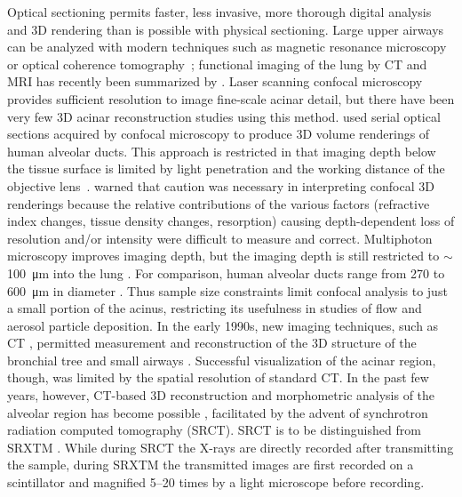 Optical sectioning permits faster, less invasive, more thorough digital analysis and 3D rendering than is possible with physical sectioning. Large upper airways can be analyzed with modern techniques such as magnetic resonance microscopy~\cite{Hoffman1990,Sundaramoorthy1995} or optical coherence tomography~\cite{Hanna2005}; functional imaging of the lung by CT and MRI has recently been summarized by \citet{VanBeek2008}. Laser scanning confocal microscopy provides sufficient resolution to image fine-scale acinar detail, but there have been very few 3D acinar reconstruction studies using this method. \citet{Cookson1993} used serial optical sections acquired by confocal microscopy to produce 3D volume renderings of human alveolar ducts. This approach is restricted in that imaging depth below the tissue surface is limited by light penetration and the working distance of the objective lens~\cite{Bonse1996}. \citet{Cookson1993} warned that caution was necessary in interpreting confocal 3D renderings because the relative contributions of the various factors (refractive index changes, tissue density changes, resorption) causing depth-dependent loss of resolution and/or intensity were difficult to measure and correct. Multiphoton microscopy improves imaging depth, but the imaging depth is still restricted to $\sim$\SI{100}{\micro\meter} into the lung \cite{Pena2007}. For comparison, human alveolar ducts range from 270 to \SI{600}{\micro\meter} in diameter \cite{Whimster1970}. Thus sample size constraints limit confocal analysis to just a small portion of the acinus, restricting its usefulness in studies of flow and aerosol particle deposition. In the early 1990s, new imaging techniques, such as CT \cite{Brown1991,Mcnamara1992}, permitted measurement and reconstruction of the 3D structure of the bronchial tree and small airways \cite{Aykac2003,Higgins1998,Park1998,Reinhardt1997,Sauret2002,Sera2003,Wood1995,Wood1995a}. Successful visualization of the acinar region, though, was limited by the spatial resolution of standard \micro CT. In the past few years, however, \micro CT-based 3D reconstruction and morphometric analysis of the alveolar region has become possible \cite{Langheinrich2004,Litzlbauer2006,Watz2005}, facilitated by the advent of synchrotron radiation computed tomography (SRCT). SRCT is to be distinguished from SRXTM \cite{Schittny2008,Stampanoni2002,Stampanoni2007}. While during SRCT the X-rays are directly recorded after transmitting the sample, during SRXTM the transmitted images are first recorded on a scintillator and magnified 5--20 times by a light microscope before recording.

